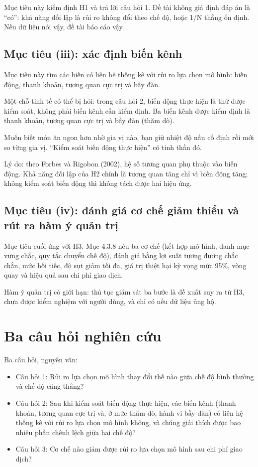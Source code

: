 Mục tiêu này kiểm định H1 và trả lời câu hỏi 1. Đề tài không giả định đáp án là “có”: khả năng đối lập là rủi ro không đổi theo chế độ, hoặc 1/N thắng ổn định. Nếu dữ liệu nói vậy, đề tài báo cáo vậy.

\subsection{Mục tiêu (iii): xác định biến kênh}

Mục tiêu này tìm các biến có liên hệ thống kê với rủi ro lựa chọn mô hình: biến động, thanh khoản, tương quan cực trị và bầy đàn.

Một chỗ tinh tế có thể bị hỏi: trong câu hỏi 2, biến động thực hiện là thứ được kiểm soát, không phải biến kênh cần kiểm định. Ba biến kênh được kiểm định là thanh khoản, tương quan cực trị và bầy đàn (thăm dò).

Muốn biết món ăn ngon hơn nhờ gia vị nào, bạn giữ nhiệt độ nấu cố định rồi mới so từng gia vị. “Kiểm soát biến động thực hiện” có tinh thần đó.

Lý do: theo Forbes và Rigobon (2002), hệ số tương quan phụ thuộc vào biến động. Khả năng đối lập của H2 chính là tương quan tăng chỉ vì biến động tăng; không kiểm soát biến động thì không tách được hai hiệu ứng.

\subsection{Mục tiêu (iv): đánh giá cơ chế giảm thiểu và rút ra hàm ý quản trị}

Mục tiêu cuối ứng với H3. Mục 4.3.8 nêu ba cơ chế (kết hợp mô hình, danh mục vững chắc, quy tắc chuyển chế độ), đánh giá bằng lợi suất tương đương chắc chắn, mức hối tiếc, độ sụt giảm tối đa, giá trị thiệt hại kỳ vọng mức 95\%, vòng quay và hiệu quả sau chi phí giao dịch.

Hàm ý quản trị có giới hạn: thủ tục giám sát ba bước là đề xuất suy ra từ H3, chưa được kiểm nghiệm với người dùng, và chỉ có nếu dữ liệu ủng hộ.

\section{Ba câu hỏi nghiên cứu}

Ba câu hỏi, nguyên văn:

\begin{itemize}
\item
  Câu hỏi 1: Rủi ro lựa chọn mô hình thay đổi thế nào giữa chế độ bình thường và chế độ căng thẳng?
\item
  Câu hỏi 2: Sau khi kiểm soát biến động thực hiện, các biến kênh (thanh khoản, tương quan cực trị và, ở mức thăm dò, hành vi bầy đàn) có liên hệ thống kê với rủi ro lựa chọn mô hình không, và chúng giải thích được bao nhiêu phần chênh lệch giữa hai chế độ?
\item
  Câu hỏi 3: Cơ chế nào giảm được rủi ro lựa chọn mô hình sau chi phí giao dịch?
\end{itemize}


